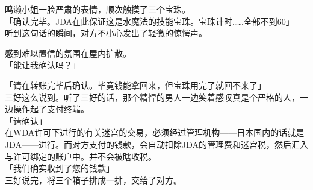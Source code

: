 鸣濑小姐一脸严肃的表情，顺次触摸了三个宝珠。\\

「确认完毕。JDA在此保证这是水魔法的技能宝珠。宝珠计时……全部不到60」\\

听到这句话的瞬间，对方不小心发出了轻微的惊愕声。

感到难以置信的氛围在屋内扩散。\\

「能让我确认吗？」

「请在转账完毕后确认。毕竟钱能拿回来，但宝珠用完了就回不来了」\\

三好这么说到。听了三好的话，那个精悍的男人一边笑着感叹真是个严格的人，一边操作起了支付终端。\\

「请确认」\\

在WDA许可下进行的有关迷宫的交易，必须经过管理机构——日本国内的话就是JDA——进行。而对方支付的钱款，会自动扣除JDA的管理费和迷宫税，然后汇入与许可绑定的账户中。并不会被瞎收税。\\

「我们确实收到了您的钱款」\\

三好说完，将三个箱子排成一排，交给了对方。\\

